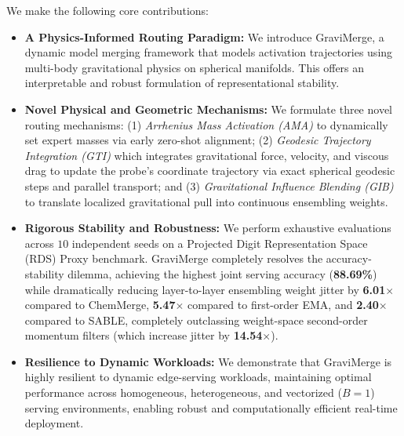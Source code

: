 We make the following core contributions:
\begin{itemize}
    \item \textbf{A Physics-Informed Routing Paradigm: } We introduce GraviMerge, a dynamic model merging framework that models activation trajectories using multi-body gravitational physics on spherical manifolds. This offers an interpretable and robust formulation of representational stability.
    \item \textbf{Novel Physical and Geometric Mechanisms: } We formulate three novel routing mechanisms: (1) \textit{Arrhenius Mass Activation (AMA)} to dynamically set expert masses via early zero-shot alignment; (2) \textit{Geodesic Trajectory Integration (GTI)} which integrates gravitational force, velocity, and viscous drag to update the probe's coordinate trajectory via exact spherical geodesic steps and parallel transport; and (3) \textit{Gravitational Influence Blending (GIB)} to translate localized gravitational pull into continuous ensembling weights.
    \item \textbf{Rigorous Stability and Robustness: } We perform exhaustive evaluations across $10$ independent seeds on a Projected Digit Representation Space (RDS) Proxy benchmark. GraviMerge completely resolves the accuracy-stability dilemma, achieving the highest joint serving accuracy (\textbf{88.69\%}) while dramatically reducing layer-to-layer ensembling weight jitter by \textbf{6.01$\times$} compared to ChemMerge, \textbf{5.47$\times$} compared to first-order EMA, and \textbf{2.40$\times$} compared to SABLE, completely outclassing weight-space second-order momentum filters (which increase jitter by \textbf{14.54$\times$}).
    \item \textbf{Resilience to Dynamic Workloads: } We demonstrate that GraviMerge is highly resilient to dynamic edge-serving workloads, maintaining optimal performance across homogeneous, heterogeneous, and vectorized ($B=1$) serving environments, enabling robust and computationally efficient real-time deployment.
\end{itemize}
